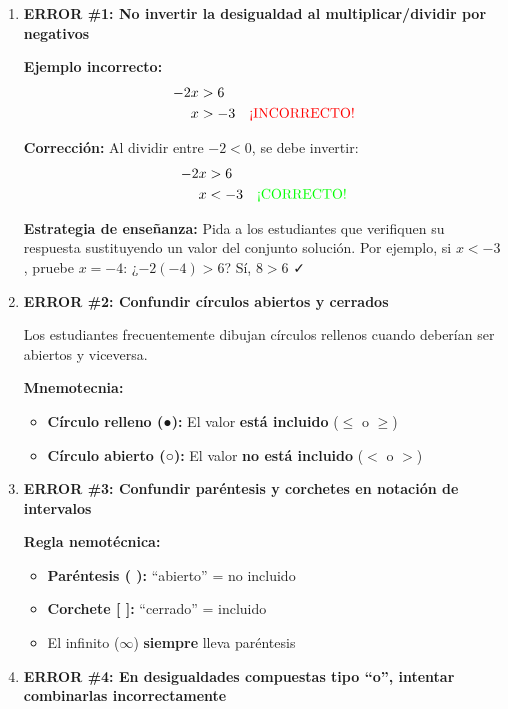 \begin{enumerate}
    \item \textbf{ERROR \#1: No invertir la desigualdad al multiplicar/dividir por negativos}

    \textbf{Ejemplo incorrecto:}
    \begin{align*}
        -2x &> 6 \\
        x &> -3 \quad \textcolor{red}{\text{¡INCORRECTO!}}
    \end{align*}

    \textbf{Corrección:} Al dividir entre $-2 < 0$, se debe invertir:
    \begin{align*}
        -2x &> 6 \\
        x &< -3 \quad \textcolor{green}{\text{¡CORRECTO!}}
    \end{align*}

    \textbf{Estrategia de enseñanza:} Pida a los estudiantes que verifiquen su respuesta sustituyendo un valor del conjunto solución. Por ejemplo, si $x < -3$, pruebe $x = -4$: ¿$-2(-4) > 6$? Sí, $8 > 6$ ✓

    \item \textbf{ERROR \#2: Confundir círculos abiertos y cerrados}

    Los estudiantes frecuentemente dibujan círculos rellenos cuando deberían ser abiertos y viceversa.

    \textbf{Mnemotecnia:}
    \begin{itemize}
        \item \textbf{Círculo relleno (●):} El valor \textbf{está incluido} ($\le$ o $\ge$)
        \item \textbf{Círculo abierto (○):} El valor \textbf{no está incluido} ($<$ o $>$)
    \end{itemize}

    \item \textbf{ERROR \#3: Confundir paréntesis y corchetes en notación de intervalos}

    \textbf{Regla nemotécnica:}
    \begin{itemize}
        \item \textbf{Paréntesis ( ):} ``abierto'' = no incluido
        \item \textbf{Corchete [ ]:} ``cerrado'' = incluido
        \item El infinito ($\infty$) \textbf{siempre} lleva paréntesis
    \end{itemize}

    \item \textbf{ERROR \#4: En desigualdades compuestas tipo ``o'', intentar combinarlas incorrectamente}


\end{enumerate}

